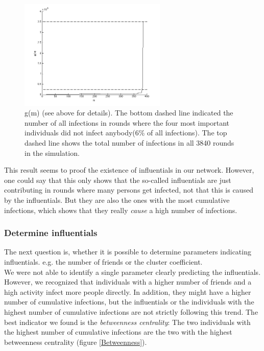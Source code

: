 \begin{figure}
\begin{center}
\includegraphics[width=7cm]{influ3}
\caption{ g(m) (see above for details). The bottom dashed line indicated the number of all infections in rounds where the four most important individuals did not infect anybody(6\% of all infections). The top dashed line shows the total number of infections in all 3840 rounds in the simulation.}
\label{importancedist}
\end{center}
\end{figure}

\noindent This result seems to proof the existence of influentials in our network. However, one could say that this only shows that the so-called influentials are just contributing in rounds where many persons get infected, not that this is caused by the influentials. But they are also the ones with the most cumulative infections, which shows that they really \textit{cause} a high number of infections.

\subsubsection{Determine influentials}

The next question is, whether it is possible to determine parameters indicating influentials. e.g. the number of friends or the cluster coefficient.
\\
We were not able to identify a single parameter clearly predicting the influentials. However, we recognized that individuals with a higher number of friends and a high activity infect more people directly. In addition, they might have a higher number of cumulative infections, but the influentials or the individuals with the highest number of cumulative infections are not strictly following this trend. The best indicator we found is the \textit{betweenness centrality}: The two individuals with the highest number of cumulative infections are the two with the highest betweenness centrality (figure \ref{Betweenness}). 

